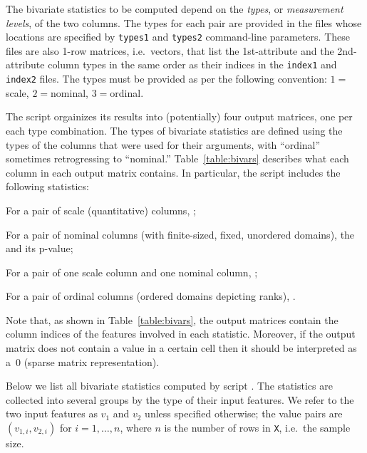 The bivariate statistics to be computed depend on the \emph{types}, or
\emph{measurement levels}, of the two columns.
The types for each pair are provided in the files whose locations are specified by
\texttt{types1} and \texttt{types2} command-line parameters.
These files are also 1-row matrices, i.e.\ vectors, that list the 1st-attribute and
the 2nd-attribute column types in the same order as their indices in the
\texttt{index1} and \texttt{index2} files.  The types must be provided as per
the following convention: $1 = {}$scale, $2 = {}$nominal, $3 = {}$ordinal.

The script orgainizes its results into (potentially) four output matrices, one per
each type combination.  The types of bivariate statistics are defined using the types
of the columns that were used for their arguments, with ``ordinal'' sometimes
retrogressing to ``nominal.''  Table~\ref{table:bivars} describes what each column
in each output matrix contains.  In particular, the script includes the following
statistics:
\begin{Itemize}
\item For a pair of scale (quantitative) columns, \NameStatR;
\item For a pair of nominal columns (with finite-sized, fixed, unordered domains), 
the \NameStatChi{} and its p-value;
\item For a pair of one scale column and one nominal column, \NameStatF{};
\item For a pair of ordinal columns (ordered domains depicting ranks), \NameStatRho.
\end{Itemize}
Note that, as shown in Table~\ref{table:bivars}, the output matrices contain the
column indices of the features involved in each statistic.
Moreover, if the output matrix does not contain
a value in a certain cell then it should be interpreted as a~$0$
(sparse matrix representation).

Below we list all bivariate statistics computed by script \BivarScriptName.
The statistics are collected into several groups by the type of their input
features.  We refer to the two input features as $v_1$ and $v_2$ unless
specified otherwise; the value pairs are $(v_{1,i}, v_{2,i})$ for $i=1,\ldots,n$,
where $n$ is the number of rows in \texttt{X}, i.e.\ the sample size.


